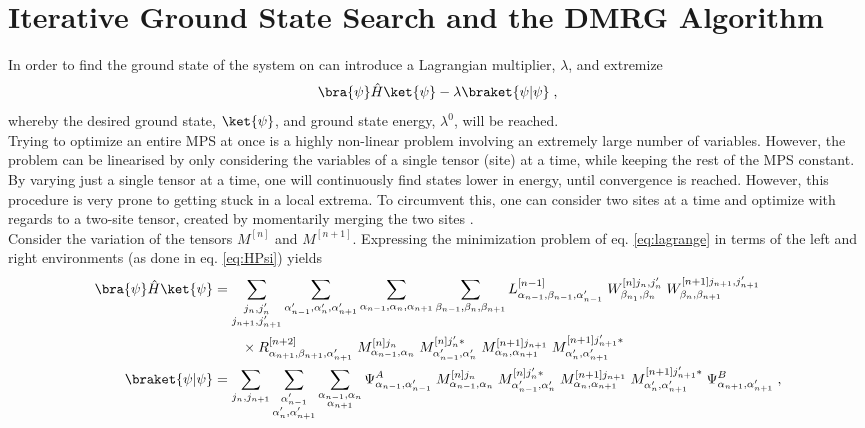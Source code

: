 \section{Iterative Ground State Search and the DMRG Algorithm} \label{sec:DMRG}
In order to find the ground state of the system on can introduce a Lagrangian multiplier, $\lambda$, and extremize
\begin{equation}
	\bra{\psi} \hat{H} \ket{\psi} - \lambda \braket{\psi | \psi} \; ,
	\label{eq:lagrange}
\end{equation}
whereby the desired ground state, $\ket{\psi}$, and ground state energy, $\lambda^0$, will be reached.\\
Trying to optimize an entire MPS at once is a highly non-linear problem involving an extremely large number of variables. However, the problem can be linearised by only considering the variables of a single tensor (site) at a time, while keeping the rest of the MPS constant. By varying just a single tensor at a time, one will continuously find states lower in energy, until convergence is reached. However, this procedure is very prone to getting stuck in a local extrema. To circumvent this, one can consider two sites at a time and optimize with regards to a two-site tensor, created by momentarily merging the two sites \cite{WhiteDMRG}.\\
Consider the variation of the tensors $M^{[n]}$ and $M^{[n+1]}$. Expressing the minimization problem of eq. \eqref{eq:lagrange} in terms of the left and right environments (as done in eq. \eqref{eq:HPsi}) yields
\begin{align}
	\bra{\psi} \hat{H} \ket{\psi} &= \sum_{\substack{j_n , j_n ' \\ j_{n+1} , j_{n+1} '}} \sum_{\alpha_{n-1} ' , \alpha_n ', \alpha_{n+1} '} \sum_{\alpha_{n-1} , \alpha_n , \alpha_{n+1}} \sum_{\beta_{n-1} , \beta_n , \beta_{n+1}} L_{\alpha_{n-1}, \beta_{n-1} , \alpha_{n-1} '}^{[n-1]} \; W_{\beta_{n_1}, \beta_n}^{[n] j_n , j_n '} \; W_{\beta_{n}, \beta_{n+1}}^{[n+1] j_{n+1} , j_{n+1} '} \nonumber \\
	& \qquad \times R_{\alpha_{n+1} ,\beta_{n+1} , \alpha_{n+1} '}^{[n+2]} \; M_{\alpha_{n-1} , \alpha_{n}}^{[n] j_n } \; M_{\alpha_{n-1} ' , \alpha_{n} '}^{[n] j_n ' *} \; M_{\alpha_{n} , \alpha_{n+1}}^{[n+1] j_{n+1} } \; M_{\alpha_{n} ' , \alpha_{n+1} '}^{[n+1] j_{n+1} ' *}  \label{eq:twositeHamil}\\
	\braket{\psi | \psi} &= \sum_{j_n , j_{n+1} } \sum_{\substack{\alpha_{n-1} ' \\ \alpha_n ', \alpha_{n+1} '}} \sum_{\substack{\alpha_{n-1} , \alpha_n \\ \alpha_{n+1}}} \Psi_{\alpha_{n-1},\alpha_{n-1}'}^{A} \; M_{\alpha_{n-1} , \alpha_{n}}^{[n] j_n } \; M_{\alpha_{n-1} ' , \alpha_{n} '}^{[n] j_n ' *} \; M_{\alpha_{n} , \alpha_{n+1}}^{[n+1] j_{n+1} } \; M_{\alpha_{n} ' , \alpha_{n+1} '}^{[n+1] j_{n+1} ' *} \; \Psi_{\alpha_{n+1},\alpha_{n+1}'}^{B} \; , \label{eq:twositeOverlap}
\end{align}
